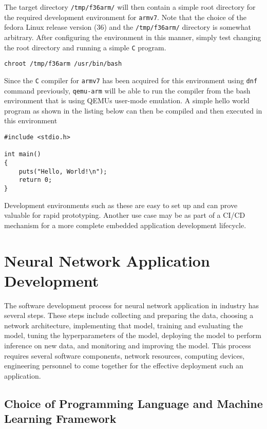 The target directory \texttt{/tmp/f36arm/} will then contain a simple root directory for the required development environment for \texttt{armv7}. Note that the choice of the fedora Linux release version (36) and the \texttt{/tmp/f36arm/} directory is somewhat arbitrary. After configuring the environment in this manner, simply test changing the root directory and running a simple \texttt{C} program.

\begin{verbatim}
chroot /tmp/f36arm /usr/bin/bash
\end{verbatim}

Since the \texttt{C} compiler for \texttt{armv7} has been acquired for this environment using \texttt{dnf} command previously, \texttt{qemu-arm} will be able to run the compiler from the bash environment that is using QEMU\textquotesingle s user-mode emulation. A simple hello world program as shown in the listing below can then be compiled and then executed in this environment

\begin{verbatim}
#include <stdio.h>

int main()
{
	puts("Hello, World!\n");
	return 0;
}
\end{verbatim}

Development environments such as these are easy to set up and can prove valuable for rapid prototyping. Another use case may be as part of a CI/CD mechanism for a more complete embedded application development lifecycle.

\section{Neural Network Application Development}

The software development process for neural network application in industry has several steps. These steps include collecting and preparing the data, choosing a network architecture, implementing that model, training and evaluating the model, tuning the hyperparameters of the model, deploying the model to perform inference on new data, and monitoring and improving the model. This process requires several software components, network resources, computing devices, engineering personnel to come together for the effective deployment such an application.

\subsection{Choice of Programming Language and Machine Learning Framework}

